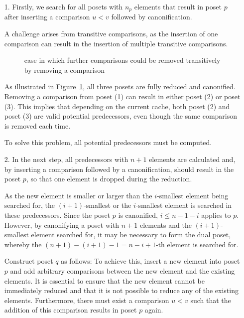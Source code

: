 \documentclass[10pt,journal,compsoc]{IEEEtran}
\begin{document}
\begin{itemize}
  \item[1.]
        Firstly, we search for all posets with $n_p$ elements that result in poset $p$ after inserting a comparison $u < v$ followed by canonification.

        A challenge arises from transitive comparisons, as the insertion of one comparison can result in the insertion of multiple transitive comparisons.

        \begin{figure}[!b]
          \centering
          
          \caption{case in which further comparisons could be removed transitively by removing a comparison}
          \label{fig:backward_problematic}
        \end{figure}

        As illustrated in Figure~\ref{fig:backward_problematic}, all three posets are fully reduced and canonified.
        Removing a comparison from poset (1) can result in either poset (2) or poset (3).
        This implies that depending on the current cache, both poset (2) and poset (3) are valid potential predecessors, even though the same comparison is removed each time.

        To solve this problem, all potential predecessors must be computed.

  \item[2.]
        In the next step, all predecessors with $n + 1$ elements are calculated and, by inserting a comparison followed by a canonification, should result in the poset $p$, so that one element is dropped during the reduction.

        As the new element is smaller or larger than the $i$-smallest element being searched for, the $(i + 1)$-smallest or the $i$-smallest element is searched in these predecessors. Since the poset $p$ is canonified, $i \leq n - 1 - i$ applies to $p$. However, by canonifying a poset with $n + 1$ elements and the $(i + 1)$-smallest element searched for, it may be necessary to form the dual poset, whereby the $(n + 1) - (i + 1) - 1 = n - i + 1$-th element is searched for.

        Construct poset $q$ as follows:
        To achieve this, insert a new element into poset $p$ and add arbitrary comparisons between the new element and the existing elements.
        It is essential to ensure that the new element cannot be immediately reduced and that it is not possible to reduce any of the existing elements.
        Furthermore, there must exist a comparison $u < v$ such that the addition of this comparison results in poset $p$ again.


\end{itemize}
\end{document}
